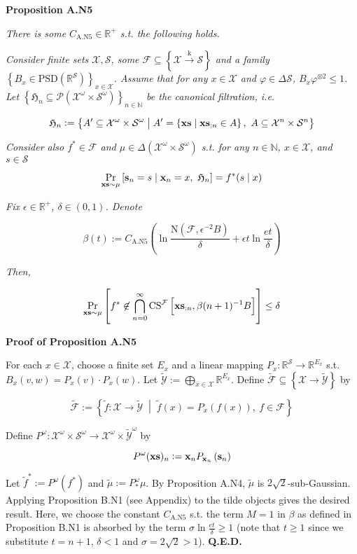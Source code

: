 \documentclass[a4paper]{article}
\newcommand{\Co}[1]{}
\newcommand{\AP}[1]{\left(#1\right)}
\newcommand{\AB}[1]{\left[#1\right]}
\newcommand{\AC}[1]{\left\{#1\right\}}
\newcommand{\ABM}[2]{\left[#1\;\middle\vert\;#2\right]}
\newcommand{\ACM}[2]{\left\{#1\;\middle\vert\;#2\right\}}
\newcommand{\Pa}[2]{\underset{#1}{\operatorname{Pr}}\AB{#2}}
\newcommand{\CP}[3]{\underset{#1}{\operatorname{Pr}}\ABM{#2}{#3}}
\newcommand{\PS}[1]{\mathcal{P}\AP{#1}}
\newcommand{\Nats}{\mathbb{N}}
\newcommand{\Reals}{\mathbb{R}}
\newcommand{\PSD}{\mathrm{PSD}}
\newcommand{\K}{\xrightarrow{\mathrm{k}}}
\newcommand{\B}{B}
\newcommand{\X}{\mathcal{X}}
\newcommand{\Y}{\mathcal{Y}}
\newcommand{\F}{\mathcal{F}}
\newcommand{\St}{\mathcal{S}}
\newcommand{\N}{\mathrm{N}}
\newcommand{\CS}{\mathrm{CS}}
\begin{document}
\textbf{Proposition A.N5}\Co{b}

\textit{There is some $C_{\mathrm{A.N5}}\in\Reals^+$ s.t. the following holds.}\Co{i}

\textit{Consider finite sets $\X,\St$, some $\F\subseteq\AC{\X\K\St}$ and a family $\AC{\B _x\in\PSD\AP{\Reals^\St}}_{x\in\X}$. Assume that for any $x\in\X$ and $\varphi\in\Delta\St$, $B_x\varphi^{\otimes2}\leq1$. Let $\AC{\mathfrak{H}_n\subseteq\PS{\X^\omega\times\St^\omega}}_{n\in\Nats}$ be the canonical filtration, i.e.}\Co{i}

$$\mathfrak{H}_n:=\ACM{A'\subseteq\X^\omega\times\St^\omega}{A'=\ACM{\bold{xs}}{\bold{xs}_{:n}\in A},\ A\subseteq\X^n\times\St^n}$$

\textit{Consider also $f^*\in\F$ and $\mu\in\Delta\AP{\X^\omega\times\St^\omega}$ s.t. for any $n\in\Nats$, $x\in\X$, and $s\in\St$}\Co{i}

$$\CP{\bold{xs}\sim\mu}{\bold{s}_n=s}{\bold{x}_n=x,\ \mathfrak{H}_n} = f^*(s\mid x)$$

\textit{Fix $\epsilon\in\Reals^+$, $\delta\in(0,1)$. Denote}\Co{i}

$$\beta(t):=C_{\mathrm{A.N5}}\AP{\ln{\frac{\N(\F,\epsilon^{-2}\B )}{\delta}}+\epsilon t\ln{\frac{et}{\delta}}}$$

\textit{Then,}\Co{i}

$$\Pa{\bold{xs}\sim\mu}{f^*\not\in\bigcap_{n=0}^\infty\CS^\F\AB{\bold{xs}_{:n},\beta(n+1)^{-1}\B}} \leq \delta$$

\textbf{Proof of Proposition A.N5}\Co{b}

For each $x\in\X$, choose a finite set $E_x$ and a linear mapping $P_x:\Reals^\St\rightarrow\Reals^{E_x}$ s.t. $B_x\AP{v,w}=P_x(v)\cdot P_x(w)$. Let $\tilde{\Y}:=\bigoplus_{x\in\X}\Reals^{E_x}$. Define $\tilde{\F}\subseteq\AC{\X\rightarrow\tilde{\Y}}$ by

$$\tilde{\F}:=\ACM{\tilde{f}:\X\rightarrow\tilde{\Y}}{\tilde{f}(x)=P_x\AP{f(x)},\ f\in\F}$$

Define $P^\omega:\X^\omega\times\St^\omega\rightarrow\X^\omega\times\tilde{\Y}^\omega$ by

$$P^\omega(\bold{xs})_n:=\bold{x}_nP_{\bold{x}_n}\AP{\bold{s}_n}$$

Let $\tilde{f}^*:=P^\omega\AP{f^*}$ and $\tilde{\mu}:=P^\omega_*\mu$. By Proposition A.N4, $\tilde{\mu}$ is $2\sqrt{2}$-sub-Gaussian. Applying Proposition B.N1 (see Appendix) to the tilde objects gives the desired result. Here, we choose the constant $C_{\text{A.N5}}$ s.t. the term $M=1$ in $\beta$ as defined in Proposition B.N1 is absorbed by the term $\sigma\ln{\frac{et}{\delta}}\geq1$ (note that $t\geq1$ since we substitute $t=n+1$, $\delta<1$ and $\sigma=2\sqrt{2}>1$). \textbf{Q.E.D.}\Co{b}
\end{document}
